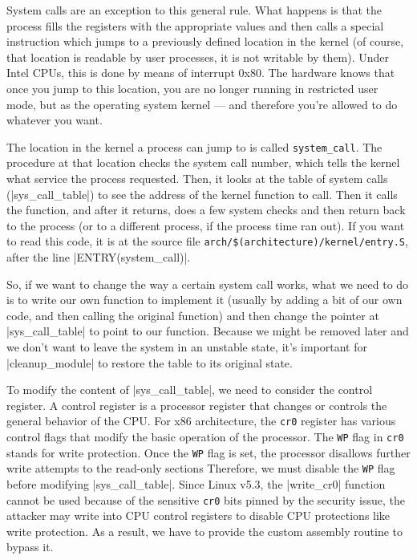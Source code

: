 \documentclass[10pt, oneside]{book}
\begin{document}
System calls are an exception to this general rule.
What happens is that the process fills the registers with the appropriate values and then calls a special instruction which jumps to a previously defined location in the kernel (of course, that location is readable by user processes, it is not writable by them).
Under Intel CPUs, this is done by means of interrupt 0x80. The hardware knows that once you jump to this location, you are no longer running in restricted user mode, but as the operating system kernel --- and therefore you're allowed to do whatever you want.

The location in the kernel a process can jump to is called \verb|system_call|.
The procedure at that location checks the system call number, which tells the kernel what service the process requested.
Then, it looks at the table of system calls (\cpp|sys_call_table|) to see the address of the kernel function to call.
Then it calls the function, and after it returns, does a few system checks and then return back to the process (or to a different process, if the process time ran out).
If you want to read this code, it is at the source file \verb|arch/$(architecture)/kernel/entry.S|, after the line \cpp|ENTRY(system_call)|.

So, if we want to change the way a certain system call works, what we need to do is to write our own function to implement it (usually by adding a bit of our own code, and then calling the original function) and then change the pointer at \cpp|sys_call_table| to point to our function.
Because we might be removed later and we don't want to leave the system in an unstable state, it's important for \cpp|cleanup_module| to restore the table to its original state.

To modify the content of \cpp|sys_call_table|, we need to consider the control register.
A control register is a processor register that changes or controls the general behavior of the CPU.
For x86 architecture, the \verb|cr0| register has various control flags that modify the basic operation of the processor.
The \verb|WP| flag in \verb|cr0| stands for write protection.
Once the \verb|WP| flag is set, the processor disallows further write attempts to the read-only sections
Therefore, we must disable the \verb|WP| flag before modifying \cpp|sys_call_table|.
Since Linux v5.3, the \cpp|write_cr0| function cannot be used because of the sensitive \verb|cr0| bits pinned by the security issue, the attacker may write into CPU control registers to disable CPU protections like write protection.
As a result, we have to provide the custom assembly routine to bypass it.
\end{document}
